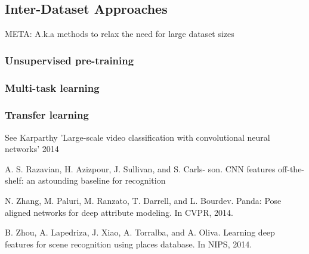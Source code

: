\subsection{Inter-Dataset Approaches}
META: A.k.a methods to relax the need for large dataset sizes

\subsubsection{Unsupervised pre-training}

\subsubsection{Multi-task learning}

\subsubsection{Transfer learning}

See Karparthy 'Large-scale video classification with convolutional neural networks' 2014

A. S. Razavian, H. Azizpour, J. Sullivan, and S. Carls-
son. CNN features off-the-shelf: an astounding baseline for
recognition

N. Zhang, M. Paluri, M. Ranzato, T. Darrell, and L. Bourdev. Panda: Pose aligned networks for deep attribute modeling. In CVPR, 2014.

B. Zhou, A. Lapedriza, J. Xiao, A. Torralba, and A. Oliva. Learning deep features for scene recognition using places database. In NIPS, 2014.
